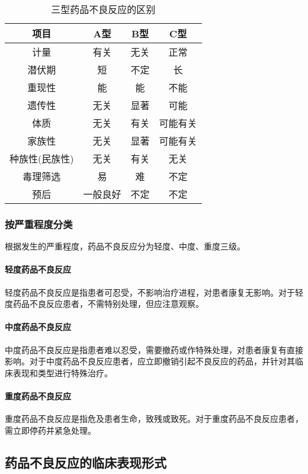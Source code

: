 \begin{table}[ht]
    \caption{三型药品不良反应的区别}
    \label{tab3-1}
    \centering
    \begin{tabular}{cccc}
    \toprule
    项目 & A型 & B型 & C型 \\
    \midrule
    计量 & 有关 & 无关 & 正常\\
    潜伏期 & 短 & 不定 & 长 \\
    重现性 & 能 & 能 & 不能\\
    遗传性 & 无关 & 显著 & 可能\\
    体质 & 无关 & 有关 & 可能有关\\
    家族性 & 无关 & 显著 & 可能有关\\
    种族性(民族性) & 无关 & 有关 & 无关\\
    毒理筛选 & 易 & 难 & 不定\\
    预后 & 一般良好 & 不定 & 不定\\
    \bottomrule
    \end{tabular}
\end{table}


\subsubsection{按严重程度分类}

根据发生的严重程度，药品不良反应分为轻度、中度、重度三级。
\paragraph{轻度药品不良反应}

轻度药品不良反应是指患者可忍受，不影响治疗进程，对患者康复无影响。对于轻度药品不良反应患者，不需特别处理，但应注意观察。
\paragraph{中度药品不良反应}

中度药品不良反应是指患者难以忍受，需要撤药或作特殊处理，对患者康复有直接影响。对于中度药品不良反应患者，应立即撤销引起不良反应的药品，并针对其临床表现和类型进行特殊治疗。
\paragraph{重度药品不良反应}

重度药品不良反应是指危及患者生命，致残或致死。对于重度药品不良反应患者，需立即停药并紧急处理。

\subsection{药品不良反应的临床表现形式}

